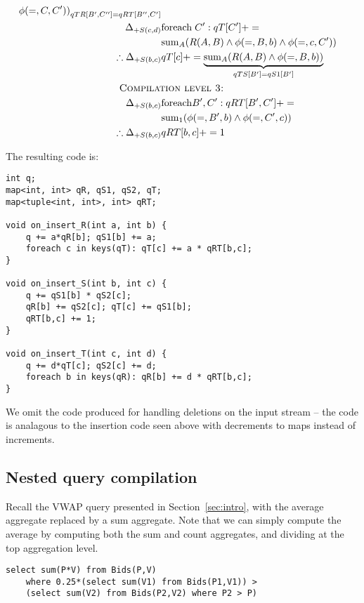 \begin{example}
\begin{align*}
{  \phi(=,C,C'))}_{qTR[B',C''] = qRT[B'',C']}
\\
\Delta_{+S(c,d)} & \algforeach \; C': qT[C'] += \\
& \algsum_{A}(R(A,B) \wedge \phi(=,B,b) \wedge \phi(=,c,C'))\\
\therefore \Delta_{+S(b,c)} & qT[c] +=
\underbrace{\algsum_{A}(R(A,B) \wedge \phi(=,B,b))}_{qTS[B'] = qS1[B']}
\\
& \hspace{-1.5cm}\mbox{\sc Compilation level 3:}\\
\Delta_{+S(b,c)} & \algforeach B',C': qRT[B',C'] += \\
& \algsum_{1}(\phi(=,B',b) \wedge \phi(=,C',c))
\\
\therefore \Delta_{+S(b,c)} & qRT[b,c] += 1
\end{align*}
\end{example}

\noindent The resulting code is:

\begin{verbatim}
int q;
map<int, int> qR, qS1, qS2, qT;
map<tuple<int, int>, int> qRT;

void on_insert_R(int a, int b) {
    q += a*qR[b]; qS1[b] += a;
    foreach c in keys(qT): qT[c] += a * qRT[b,c];
}

void on_insert_S(int b, int c) {
    q += qS1[b] * qS2[c];
    qR[b] += qS2[c]; qT[c] += qS1[b];
    qRT[b,c] += 1;
}

void on_insert_T(int c, int d) {
    q += d*qT[c]; qS2[c] += d;
    foreach b in keys(qR): qR[b] += d * qRT[b,c];
}
\end{verbatim}

We omit the code produced for handling deletions on the input stream -- the code
is analagous to the insertion code seen above with decrements to maps instead of
increments.


\subsection{Nested query compilation}
Recall the VWAP query presented in Section~\ref{sec:intro}, with the average
aggregate replaced by a sum aggregate. Note that we can simply compute the
average by computing both the sum and count aggregates, and dividing at the top
aggregation level.

\begin{verbatim}
select sum(P*V) from Bids(P,V)
    where 0.25*(select sum(V1) from Bids(P1,V1)) >
    (select sum(V2) from Bids(P2,V2) where P2 > P)
\end{verbatim}

